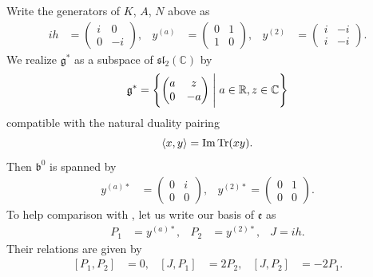 \documentclass[a4paper,11pt]{amsart}
\newcommand{\R}{\mathbb R}
\newcommand{\C}{\mathbb C}
\newcommand{\fr}[1]{\mathfrak{#1}}
\theoremstyle{definition}
\theoremstyle{remark}
\begin{document}
Write the generators of $K$, $A$, $N$ above as
\begin{align*}
i h &= \begin{pmatrix}
i & 0\\
0 & -i
\end{pmatrix},&
y^{(a)} &= \begin{pmatrix}
0 & 1\\
1 & 0
\end{pmatrix},&
y^{(2)} &= \begin{pmatrix}
i & -i\\
i & -i
\end{pmatrix}.
\end{align*}
We realize $\fr{g}^*$ as a subspace of $\fr{sl}_2(\C)$ by
\[
\fr{g}^* = \left\{ 
\begin{pmatrix}
a & z\\
0 & -a
\end{pmatrix}
\Biggm|
a \in \R, z \in \C
 \right\}
\]
compatible with the natural duality pairing
\[
\langle x, y \rangle = \Im \Tr(x y).
\]
Then $\fr{b}^0$ is spanned by
\begin{align*}
y^{(a)\ast} &= 
\begin{pmatrix}
0 & i\\
0 & 0
\end{pmatrix},&
y^{(2)\ast} = 
\begin{pmatrix}
0 & 1\\
0 & 0
\end{pmatrix}.
\end{align*}
To help comparison with \cite{MR1267935}, let us write our basis of $\fr{e}$ as
\begin{align*}
P_1 &= y^{(a)\ast},&
P_2 &= y^{(2)\ast},&
J = i h.
\end{align*}
Their relations are given by
\begin{align*}
\left[ P_1 , P_2 \right] &= 0,&
\left[ J , P_1 \right] &= 2 P_2,&
\left[ J , P_2 \right] &= - 2 P_1.
\end{align*}
\end{document}
